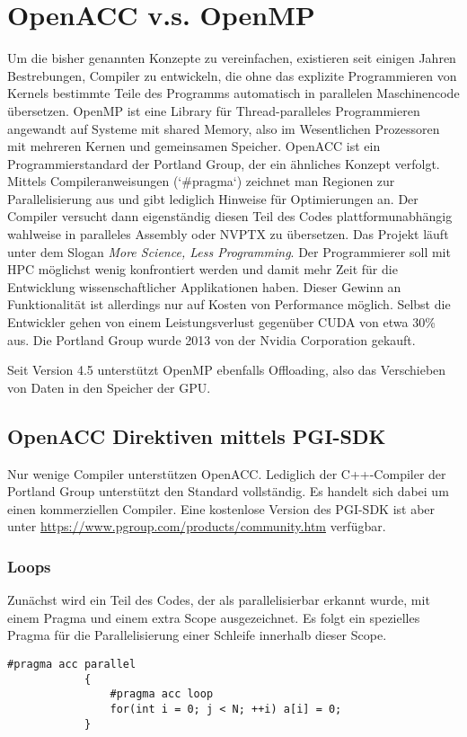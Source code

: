 	\chapter{OpenACC v.s. OpenMP}
	Um die bisher genannten Konzepte zu vereinfachen, existieren seit einigen Jahren Bestrebungen, Compiler zu entwickeln, die ohne das explizite Programmieren von \Glspl{Kernel} bestimmte Teile des Programms automatisch in parallelen Maschinencode übersetzen. OpenMP ist eine Library für Thread-paralleles Programmieren angewandt auf Systeme mit shared Memory, also im Wesentlichen Prozessoren mit mehreren Kernen und gemeinsamen Speicher. OpenACC ist ein Programmierstandard der Portland Group, der ein ähnliches Konzept verfolgt. Mittels Compileranweisungen (\li`#pragma`) zeichnet man Regionen zur Parallelisierung aus und gibt lediglich Hinweise für Optimierungen an. Der Compiler versucht dann eigenständig diesen Teil des Codes plattformunabhängig wahlweise in paralleles Assembly oder \Gls{NVPTX} zu übersetzen. Das Projekt läuft unter dem Slogan \textit{More Science, Less Programming}. Der Programmierer soll mit HPC möglichst wenig konfrontiert werden und damit mehr Zeit für die Entwicklung wissenschaftlicher Applikationen haben. Dieser Gewinn an Funktionalität ist allerdings nur auf Kosten von Performance möglich. Selbst die Entwickler gehen von einem Leistungsverlust gegenüber CUDA von etwa 30\% aus. Die Portland Group wurde 2013 von der Nvidia Corporation gekauft.
	
	Seit Version 4.5 unterstützt OpenMP ebenfalls Offloading, also das Verschieben von Daten in den Speicher der GPU.
	 
		\section{OpenACC Direktiven mittels PGI-SDK}
		Nur wenige Compiler unterstützen OpenACC. Lediglich der C++-Compiler der Portland Group unterstützt den Standard vollständig. Es handelt sich dabei um einen kommerziellen Compiler. Eine kostenlose Version des PGI-SDK ist aber unter \url{https://www.pgroup.com/products/community.htm} verfügbar.
		
			\subsection{Loops}
			Zunächst wird ein Teil des Codes, der als parallelisierbar erkannt wurde, mit einem Pragma und einem extra Scope ausgezeichnet. Es folgt ein spezielles Pragma für die Parallelisierung einer Schleife innerhalb dieser Scope. 
			\begin{lstlisting}[caption=~OpenACC: Loops]
			#pragma acc parallel
			{
				#pragma acc loop
				for(int i = 0; j < N; ++i) a[i] = 0;
			}
			\end{lstlisting}
			
